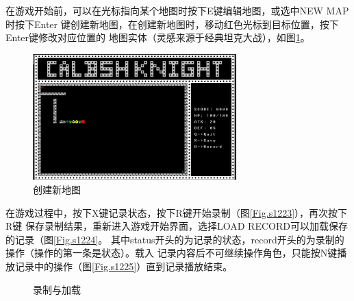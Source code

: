 \documentclass{SCIS2022cn}
\begin{document}
在游戏开始前，可以在光标指向某个地图时按下E键编辑地图，或选中NEW MAP时按下Enter
键创建新地图，在创建新地图时，移动红色光标到目标位置，按下Enter键修改对应位置的
地图实体（灵感来源于经典坦克大战），如图\ref{Fig.f1222}。

\begin{figure}[H]
    \centering
    \includegraphics[width=0.7\textwidth]{ref/1-2-2-2.jpg}
    \caption{创建新地图}
    \label{Fig.f1222}
\end{figure}

在游戏过程中，按下X键记录状态，按下R键开始录制（图\ref{Fig.s1223}），再次按下R键
保存录制结果，重新进入游戏开始界面，选择LOAD RECORD可以加载保存的记录（图\ref{Fig.s1224}。
其中status开头的为记录的状态，record开头的为录制的操作（操作的第一条是状态）。载入
记录内容后不可继续操作角色，只能按N键播放记录中的操作（图\ref{Fig.s1225}）直到记录播放结束。


\begin{figure}[H]
    \centering
    \caption{录制与加载}
    \label{Fig.f122}
\end{figure}
\end{document}
